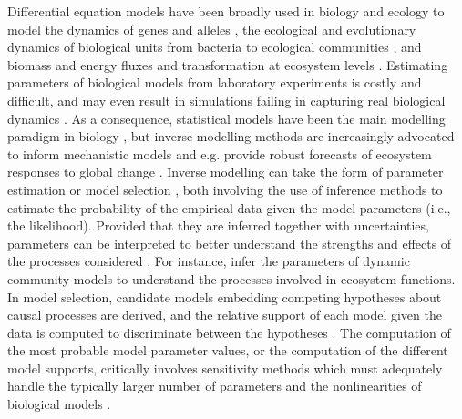 Differential equation models have been broadly used in biology and ecology to model the dynamics of genes and alleles \cite{Page2002}, the ecological and evolutionary dynamics of biological units from bacteria to ecological communities \cite{Gabor2015,Lion2018,Villa2021,Boussange2022,boussange2023a, Akesson2021,chalmandrier2021,VandenBerg2022}, and biomass and energy fluxes and transformation at ecosystem levels \cite{Weng2015,Schartau2017,Franklin2020,Geary2020}.
Estimating parameters of biological models from laboratory experiments is costly and difficult\cite{Schartau2017}, and may even result in simulations failing in capturing real biological dynamics \cite{Watts2001}. 
As a consequence, statistical models have been the main modelling paradigm in biology \cite{zimmermann2010}, but inverse modelling methods are increasingly advocated to inform mechanistic models \cite{hartig2012,alsos2023,pantel2023} and e.g. provide robust forecasts of ecosystem responses to global change \cite{alsos2023}.
Inverse modelling can take the form of parameter estimation \cite{Schartau2017} or model selection \cite{Johnson2004}, both involving the use of inference methods to estimate the probability of the empirical data given the model parameters (i.e., the likelihood).
Provided that they are inferred together with uncertainties, parameters can be interpreted to better understand the strengths and effects of the processes considered \cite{Pontarp2019}. 
For instance, \cite{Higgins2010,Curtsdotter2019,godwin2020} infer the parameters of dynamic community models to understand the processes involved in ecosystem functions.
In model selection, candidate models embedding competing hypotheses about causal processes are derived, and the relative support of each model given the data is computed to discriminate between the hypotheses \cite{Johnson2004,alsos2023}.
The computation of the most probable model parameter values, or the computation of the different model supports, critically involves sensitivity methods which must adequately handle the typically larger number of parameters and the nonlinearities of biological models \cite{Gabor2015}.

